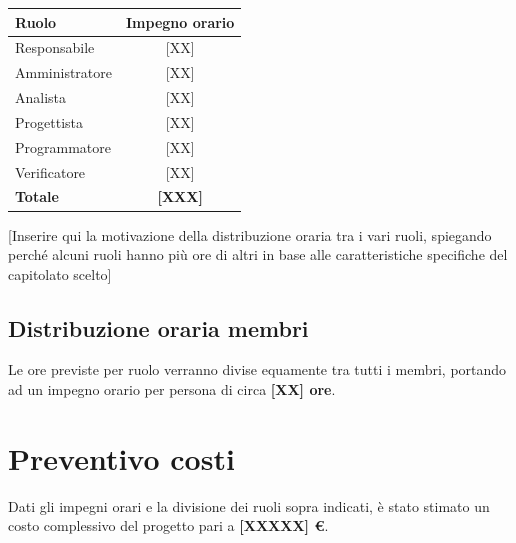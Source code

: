 \documentclass[a4paper,12pt]{article}
\begin{document}
\begin{center}
\begin{tcolorbox}[colback=secondaryblue!5,colframe=secondaryblue,width=0.7\textwidth,arc=2mm,boxrule=0.5pt]
\begin{center}
\begin{tabular}{lc}
\toprule
\textbf{Ruolo} & \textbf{Impegno orario} \\
\midrule
Responsabile & {[XX]} \\
Amministratore & {[XX]} \\
Analista & {[XX]} \\
Progettista & {[XX]} \\
Programmatore & {[XX]} \\
Verificatore & {[XX]} \\
\midrule
\textbf{Totale} & \textbf{[XXX]} \\
\bottomrule
\end{tabular}
\end{center}
\end{tcolorbox}
\end{center}

\vspace{0.5cm}

[Inserire qui la motivazione della distribuzione oraria tra i vari ruoli, spiegando perché alcuni ruoli hanno più ore di altri in base alle caratteristiche specifiche del capitolato scelto]

\subsection{Distribuzione oraria membri}

Le ore previste per ruolo verranno divise equamente tra tutti i membri, portando ad un impegno orario per persona di circa \textbf{[XX] ore}.

\newpage

\section{Preventivo costi}

Dati gli impegni orari e la divisione dei ruoli sopra indicati, è stato stimato un costo complessivo del progetto pari a \textbf{[XXXXX] \euro}.

\vspace{0.5cm}
\end{document}

